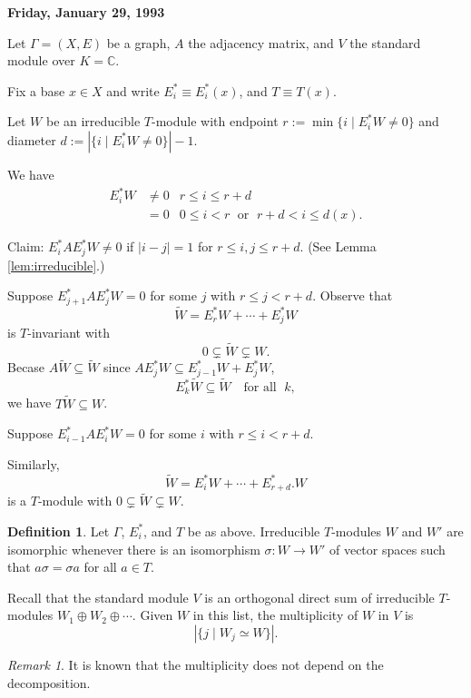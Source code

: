 \documentclass[
]{book}
\theoremstyle{definition}
\newtheorem{definition}{Definition}[chapter]
\theoremstyle{definition}
\theoremstyle{definition}
\theoremstyle{definition}
\theoremstyle{remark}
\newtheorem*{remark}{Remark}
\begin{document}
\textbf{Friday, January 29, 1993}

Let \(\Gamma = (X, E)\) be a graph, \(A\) the adjacency matrix, and \(V\) the standard module over \(K = \mathbb{C}\).

Fix a base \(x\in X\) and write \(E_i^* \equiv E_i^*(x)\), and \(T \equiv T(x)\).

Let \(W\) be an irreducible \(T\)-module with endpoint \(r:= \min\{i\mid E_i^*W \neq 0\}\) and diameter \(d:=|\{i\mid E_i^*W\neq 0\}|-1\).

We have
\begin{align}
E_i^*W & \neq 0 & r\leq i \leq r+d\\
& = 0 & 0 \leq i < r \;\text{ or }\; r+d < i \leq d(x).
\end{align}

Claim: \(E_i^*AE_j^*W \neq 0\) if \(|i-j| = 1\) for \(r\leq i,j\leq r+d\). (See Lemma \ref{lem:irreducible}.)

Suppose \(E_{j+1}^*AE_j^*W = 0\) for some \(j\) with \(r \leq j < r+d\).
Observe that
\[\tilde{W} = E^*_rW + \cdots + E^*_jW\]
is \(T\)-invariant with
\[0 \subsetneq \tilde{W} \subsetneq W.\]
Becase \(A\tilde{W} \subseteq \tilde{W}\) since \(AE_j^*W \subseteq E^*_{j-1}W + E^*_jW\),
\[E_k^*\tilde{W} \subseteq \tilde{W} \quad\text{for all }\; k,\]
we have \(T\tilde{W} \subseteq{W}\).

Suppose \(E_{i-1}^*AE_i^*W = 0\) for some \(i\) with \(r \leq i < r+d\).

Similarly,
\[\tilde{W} = E^*_iW + \cdots + E^*_{r+d}.W\]
is a \(T\)-module with \(0\subsetneq \tilde{W} \subsetneq W\).

\begin{definition}
\protect\hypertarget{def:isomorphic-modules}{}\label{def:isomorphic-modules}Let \(\Gamma\), \(E^*_i\), and \(T\) be as above. Irreducible \(T\)-modules \(W\) and \(W'\) are isomorphic whenever there is an isomorphism \(\sigma: W \to W'\) of vector spaces such that \(a\sigma = \sigma a\) for all \(a\in T\).
\end{definition}

Recall that the standard module \(V\) is an orthogonal direct sum of irreducible \(T\)-modules \(W_1 \oplus W_2 \oplus \cdots\). Given \(W\) in this list, the multiplicity of \(W\) in \(V\) is
\[|\{j \mid W_j \simeq W\}|.\]

\begin{remark}
It is known that the multiplicity does not depend on the decomposition.
\end{remark}
\end{document}
